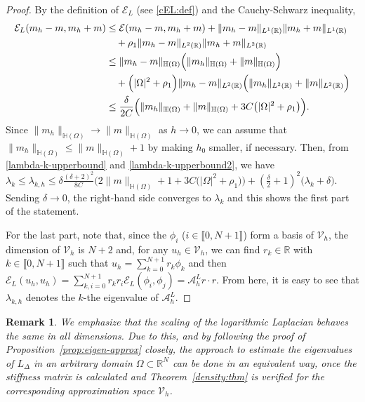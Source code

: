 \documentclass[11 pt]{article}
\newcommand\inter[1]{\llbracket #1\rrbracket}
\newtheorem{remark}[theorem]{Remark}
\numberwithin{equation}{section}
\def\R{\mathbb{R}}
\def\mH{\mathbb{H}}
\begin{document}
\begin{proof}
By the definition of $\mathcal{E}_L$ (see \eqref{cEL:def}) and the Cauchy-Schwarz inequality,
% 
\begin{align}\notag 
\mathcal{E}_L(m_h-m,m_h+m)&\leq \mathcal{E}(m_h-m,m_h+m)+\|m_h-m\|_{L^1(\R)}\|m_h+m\|_{L^1(\R)}\\ \notag
&\quad +\rho_1\|m_h-m\|_{L^2(\R)}\|m_h+m\|_{L^2(\R)}\notag \\
&\leq \|m_h-m\|_{\mH(\Omega)}\Big(\|m_h\|_{\mH(\Omega)}+\|m\|_{\mH(\Omega)}\Big)\notag \\ 
&\quad +\Big(|\Omega|^2+\rho_1\Big)\|m_h-m\|_{L^2(\R)}\Big(\|m_h\|_{L^2(\R)}+\|m\|_{L^2(\R)}\Big)\notag\\
&\leq \frac{\delta}{2C}\Big(\|m_h\|_{\mH(\Omega)}+\|m\|_{\mH(\Omega)}+3C\big(|\Omega|^2+\rho_1\big)\Big).\label{lambda-k-upperbound2}
\end{align}
%
Since $\|m_h\|_{\mH(\Omega)}\to \|m\|_{\mH(\Omega)}$ as $h\to 0$, we can assume that
$\|m_h\|_{\mH(\Omega)}\leq \|m\|_{\mH(\Omega)}+1$ by making $h_0$ smaller, if necessary. Then, from \eqref{lambda-k-upperbound} and \eqref{lambda-k-upperbound2}, we have $\lambda_k\leq \lambda_{k,h}
\leq 
\delta\frac{(\delta+2)^2}{8C}\Big(2\|m\|_{\mH(\Omega)}+1+3C\big(|\Omega|^2+\rho_1\big)\Big)
+
\left( \frac{\delta}{2}+1\right)^2\big(\lambda_k+\delta\big).$ Sending $\delta\to 0$, the right-hand side converges to $\lambda_k$ and this shows the first part of the statement.

For the last part, note that, since the $\phi_i$ ($i\in\inter{0,N+1}$) form a basis of $\mathcal{V}_h$, the dimension of $\mathcal{V}_{h}$ is $N+2$ and, for any $u_h\in \mathcal{V}_{h}$, we can find $r_k\in \R$ with $k\in \inter{0,N+1}$ such that $u_h=\sum_{k=0}^{N+1}r_k\phi_k$ and then $\mathcal{E}_L(u_h,u_h)=\sum_{k,i=0}^{N+1}r_kr_i\mathcal{E}_L(\phi_i,\phi_j)= \mathcal{A}^L_h r\cdot r.$ From here, it is easy to see that $\lambda_{k,h}$ denotes the $k$-the eigenvalue of $\mathcal{A}^L_{h}$.
\end{proof}



\begin{remark}
We emphasize that the scaling of the logarithmic Laplacian behaves the same in all dimensions. Due to this, and by following the proof of Proposition~\ref{prop:eigen-approx} closely, the approach to estimate the eigenvalues of $L_{\Delta}$ in an arbitrary domain $\Omega\subset\R^N$ can be done in an equivalent way, once the stiffness matrix is calculated and Theorem~\ref{density:thm} is verified for the corresponding approximation space $\mathcal{V}_h$.
\end{remark}
\end{document}
